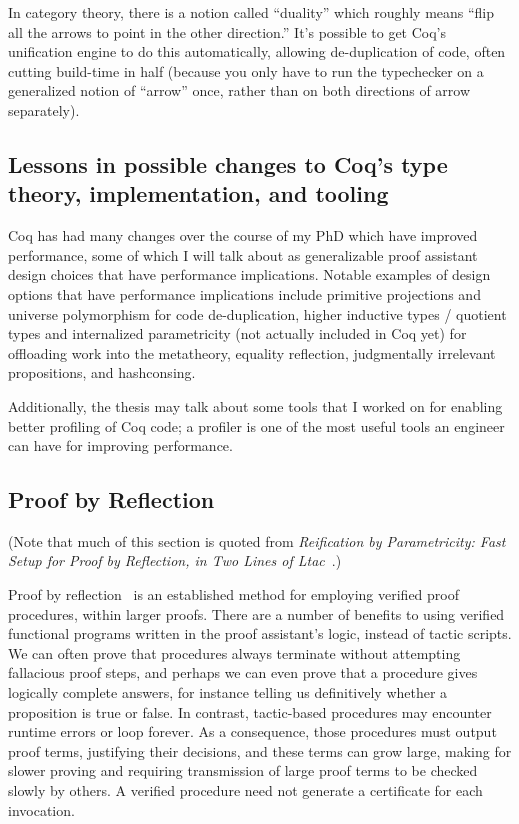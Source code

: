 \documentclass[twoside]{article}
\begin{document}
In category theory, there is a notion called ``duality'' which roughly means ``flip all the arrows to point in the other direction.''
It's possible to get Coq's unification engine to do this automatically, allowing de-duplication of code, often cutting build-time in half (because you only have to run the typechecker on a generalized notion of ``arrow'' once, rather than on both directions of arrow separately).

\subsection{Lessons in possible changes to Coq's type theory, implementation, and tooling}

Coq has had many changes over the course of my PhD which have improved performance, some of which I will talk about as generalizable proof assistant design choices that have performance implications.
Notable examples of design options that have performance implications include primitive projections and universe polymorphism for code de-duplication, higher inductive types / quotient types and internalized parametricity (not actually included in Coq yet) for offloading work into the metatheory, equality reflection, judgmentally irrelevant propositions, and hashconsing.

Additionally, the thesis may talk about some tools that I worked on for enabling better profiling of Coq code; a profiler is one of the most useful tools an engineer can have for improving performance.

\subsection{Proof by Reflection} \label{sec:proof-by-reflection}

(Note that much of this section is quoted from \emph{Reification by Parametricity: Fast Setup for Proof by Reflection, in Two Lines of {L}tac}~\cite{reification-by-parametricity}.)

Proof by reflection~\cite{ReflectionTACS97} is an established method for employing verified proof procedures, within larger proofs.
There are a number of benefits to using verified functional programs written in the proof assistant's logic, instead of tactic scripts.
We can often prove that procedures always terminate without attempting fallacious proof steps, and perhaps we can even prove that a procedure gives logically complete answers, for instance telling us definitively whether a proposition is true or false.
In contrast, tactic-based procedures may encounter runtime errors or loop forever.
As a consequence, those procedures must output proof terms, justifying their decisions, and these terms can grow large, making for slower proving and requiring transmission of large proof terms to be checked slowly by others.
A verified procedure need not generate a certificate for each invocation.
\end{document}
